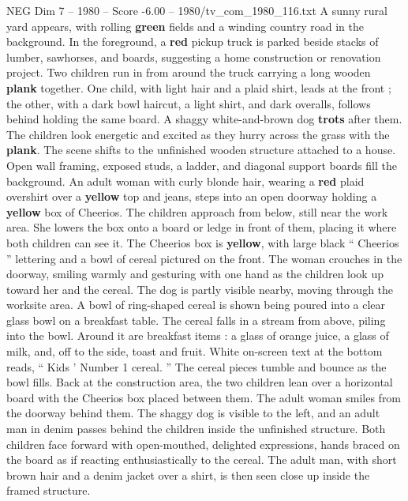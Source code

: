 \begin{textsample}{NEG Dim 7 – 1980 – Score -6.00 – 1980/tv\_com\_1980\_116.txt}  \label{ex:f7_neg_051}
A sunny rural yard appears, with rolling \textbf{green} fields and a winding country road in the background.
In the foreground, a \textbf{red} pickup truck is parked beside stacks of lumber, sawhorses, and boards, suggesting a home construction or renovation project.
Two children run in from around the truck carrying a long wooden \textbf{plank} together.
One child, with light hair and a plaid shirt, leads at the front ; the other, with a dark bowl haircut, a light shirt, and dark overalls, follows behind holding the same board.
A shaggy white-and-brown dog \textbf{trots} after them.
The children look energetic and excited as they hurry across the grass with the \textbf{plank}.
The scene shifts to the unfinished wooden structure attached to a house.
Open wall framing, exposed studs, a ladder, and diagonal support boards fill the background.
An adult woman with curly blonde hair, wearing a \textbf{red} plaid overshirt over a \textbf{yellow} top and jeans, steps into an open doorway holding a \textbf{yellow} box of Cheerios.
The children approach from below, still near the work area.
She lowers the box onto a board or ledge in front of them, placing it where both children can see it.
The Cheerios box is \textbf{yellow}, with large black “ Cheerios ” lettering and a bowl of cereal pictured on the front.
The woman crouches in the doorway, smiling warmly and gesturing with one hand as the children look up toward her and the cereal.
The dog is partly visible nearby, moving through the worksite area.
A bowl of ring-shaped cereal is shown being poured into a clear glass bowl on a breakfast table.
The cereal falls in a stream from above, piling into the bowl.
Around it are breakfast items : a glass of orange juice, a glass of milk, and, off to the side, toast and fruit.
White on-screen text at the bottom reads, “ Kids ’ Number 1 cereal. ” The cereal pieces tumble and bounce as the bowl fills.
Back at the construction area, the two children lean over a horizontal board with the Cheerios box placed between them.
The adult woman smiles from the doorway behind them.
The shaggy dog is visible to the left, and an adult man in denim passes behind the children inside the unfinished structure.
Both children face forward with open-mouthed, delighted expressions, hands braced on the board as if reacting enthusiastically to the cereal.
The adult man, with short brown hair and a denim jacket over a shirt, is then seen close up inside the framed structure.

\end{textsample}
